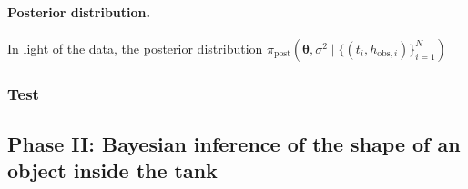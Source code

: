 \documentclass[openacc]{rsproca_new}%
\newcommand\thedatanomath {\{(t_i,h_{\text{obs}, i})\}_{i=1}^{N}}
\begin{document}
\paragraph{Posterior distribution.} In light of the data, the posterior distribution $\pi_{\text{post}}(\boldsymbol \theta, \sigma^2 \mid \thedatanomath)$

\subsubsection{Test}

\subsection{Phase II: Bayesian inference of the shape of an object inside the tank}
\end{document}
